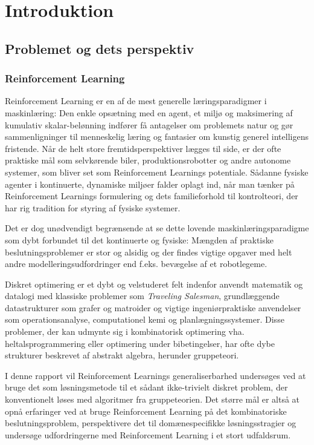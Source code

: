 \documentclass[../main.tex]{subfiles}
\begin{document}
\chapter{Introduktion}
\section{Problemet og dets perspektiv}
\subsection*{Reinforcement Learning}
Reinforcement Learning er en af de mest generelle læringsparadigmer i maskinlæring: 
Den enkle opsætning med en agent, et miljø og maksimering af kumulativ skalar-belønning indfører få antagelser om problemets natur og gør sammenligninger til menneskelig læring og fantasier om kunstig generel intelligens fristende.
Når de helt store fremtidsperspektiver lægges til side, er der ofte praktiske mål som selvkørende biler, produktionsrobotter og andre autonome systemer, som bliver set som Reinforcement Learnings potentiale.
Sådanne fysiske agenter i kontinuerte, dynamiske miljøer falder oplagt ind, når man tænker på Reinforcement Learnings formulering og dets familieforhold til kontrolteori, der har rig tradition for styring af fysiske systemer. 

Det er dog unødvendigt begrænsende at se dette lovende maskinlæringsparadigme som dybt forbundet til det kontinuerte og fysiske: Mængden af praktiske beslutningsproblemer er stor og alsidig og der findes vigtige opgaver med helt andre modelleringsudfordringer end f.eks. bevægelse af et robotlegeme.

Diskret optimering er et dybt og velstuderet felt indenfor anvendt matematik og datalogi med klassiske problemer som \textit{Traveling Salesman}, grundlæggende datastrukturer som grafer og matroider og vigtige ingeniørpraktiske anvendelser som operationsanalyse, computationel kemi og planlægningssystemer. 
Disse problemer, der kan udmynte sig i kombinatorisk optimering vha. heltalsprogrammering eller optimering under bibetingelser, har ofte dybe strukturer beskrevet af abstrakt algebra, herunder gruppeteori.
 
I denne rapport vil Reinforcement Learnings generaliserbarhed undersøges ved at bruge det som løsningsmetode til et sådant ikke-trivielt diskret problem, der konventionelt løses med algoritmer fra gruppeteorien.
Det større mål er altså at opnå erfaringer ved at bruge Reinforcement Learning på det kombinatoriske beslutningsproblem, perspektivere det til domænespecifikke løsningsstragier og undersøge udfordringerne med Reinforcement Learning i et stort udfaldsrum. 
\end{document}
